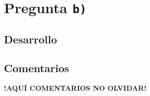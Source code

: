 \section{Pregunta \texttt{b)}}\label{pregunta-b}

\subsection{Desarrollo}


\FloatBarrier
\subsection{Comentarios}


\textbf{!AQUÍ COMENTARIOS NO OLVIDAR!}